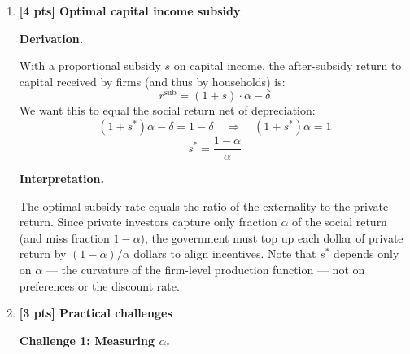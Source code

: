 \documentclass[a4paper,11pt]{article}
\begin{document}
\begin{enumerate}[label=\textbf{(\arabic*)},leftmargin=*]
\begin{answerbox}
\textbf{Comparison.}

\[
  \gamma^{\mathrm{plnr}} - \gamma^{\mathrm{mkt}} = \frac{1-\alpha}{\sigma} > 0 \quad\text{since } \alpha < 1
\]

\textbf{Intuition for the wedge.}

When any individual firm accumulates an extra unit of capital, it generates a positive externality: all other firms' productivity $a_j = K^{1-\alpha}$ rises. The private investor ignores this spillover, so the private return is only $\alpha$ while the social return is $1 = \alpha + (1-\alpha)$. The market undersaves and undergrows by the amount $(1-\alpha)/\sigma$. This is a classic Marshallian externality: the knowledge embedded in aggregate capital is a public good within the production sector, yet no mechanism compensates investors for the spillover they generate.
\end{answerbox}

\bigskip

\item \textbf{[4 pts] Optimal capital income subsidy}

\begin{answerbox}
\textbf{Derivation.}

With a proportional subsidy $s$ on capital income, the after-subsidy return to capital received by firms (and thus by households) is:
\[
  r^{\mathrm{sub}} = (1 + s)\cdot\alpha - \delta
\]
We want this to equal the social return net of depreciation:
\[
  (1 + s^*)\alpha - \delta = 1 - \delta \quad \Longrightarrow \quad (1+s^*)\alpha = 1
\]
\[
  \boxed{s^* = \frac{1-\alpha}{\alpha}}
\]

\textbf{Interpretation.}

The optimal subsidy rate equals the ratio of the externality to the private return. Since private investors capture only fraction $\alpha$ of the social return (and miss fraction $1-\alpha$), the government must top up each dollar of private return by $(1-\alpha)/\alpha$ dollars to align incentives. Note that $s^*$ depends only on $\alpha$ --- the curvature of the firm-level production function --- not on preferences or the discount rate.
\end{answerbox}

\bigskip

\item \textbf{[3 pts] Practical challenges}

\begin{answerbox}
\textbf{Challenge 1: Measuring $\alpha$.}


\end{answerbox}
\end{enumerate}
\end{document}
